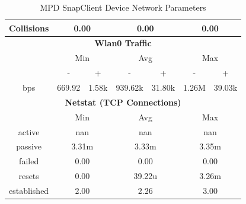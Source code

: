 \documentclass[11pt,a4paper]{scrreprt}
\begin{document}
\begin{table}[H]
\begin{tabular}{||c|c|c|c|c|c|c||}
    \hline
    Collisions & \multicolumn{2}{|c|}{0.00} & \multicolumn{2}{|c|}{0.00} & \multicolumn{2}{|c|}{0.00} \\
    \hline\hline
    \multicolumn{7}{|c|}{\textbf{Wlan0 Traffic}} \\
    \hline\hline
      & \multicolumn{2}{|c|}{Min} & \multicolumn{2}{|c|}{Avg} & \multicolumn{2}{|c|}{Max} \\
    \hline
      & - & + & - & + & - & + \\
    \hline
    bps  & 669.92 & 1.58k & 939.62k & 31.80k & 1.26M & 39.03k \\
    \hline\hline
    \multicolumn{7}{|c|}{\textbf{Netstat (TCP Connections)}} \\
    \hline\hline
      & \multicolumn{2}{|c|}{Min} & \multicolumn{2}{|c|}{Avg} & \multicolumn{2}{|c|}{Max} \\
    \hline
    active & \multicolumn{2}{|c|}{nan} & \multicolumn{2}{|c|}{nan} & \multicolumn{2}{|c|}{nan} \\
    \hline
    passive & \multicolumn{2}{|c|}{3.31m} & \multicolumn{2}{|c|}{3.33m} & \multicolumn{2}{|c|}{3.35m} \\
    \hline
    failed & \multicolumn{2}{|c|}{0.00} & \multicolumn{2}{|c|}{0.00} & \multicolumn{2}{|c|}{0.00} \\
    \hline
    resets & \multicolumn{2}{|c|}{0.00} & \multicolumn{2}{|c|}{39.22u} & \multicolumn{2}{|c|}{3.26m} \\
    \hline
    established & \multicolumn{2}{|c|}{2.00} & \multicolumn{2}{|c|}{2.26} & \multicolumn{2}{|c|}{3.00} \\
    \hline\hline
    \end{tabular}
    \caption{MPD SnapClient Device Network Parameters}
    \label{MPDclientNetTab}
\end{table}
\end{document}
